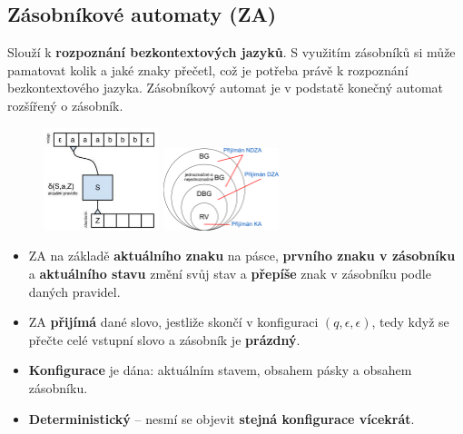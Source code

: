 \subsection{Zásobníkové automaty (ZA)}
Slouží k \textbf{rozpoznání bezkontextových jazyků}. S využitím zásobníků si může pamatovat kolik a jaké znaky přečetl, což je potřeba právě k rozpoznání bezkontextového jazyka. Zásobníkový automat je v podstatě konečný automat rozšířený o zásobník. 

\begin{figure}[H]
	\centering
	\includegraphics[width=0.30\textwidth]{assets/za}
	\includegraphics[width=0.30\textwidth]{assets/cfl}
\end{figure}

\begin{itemize}
\item ZA na základě \textbf{aktuálního znaku} na pásce, \textbf{prvního znaku v zásobníku} a \textbf{aktuálního stavu} změní svůj stav a \textbf{přepíše} znak v zásobníku podle daných pravidel.
\item ZA \textbf{přijímá} dané slovo, jestliže skončí v konfiguraci $(q, \epsilon, \epsilon)$, tedy když se přečte celé vstupní slovo a zásobník je \textbf{prázdný}.
\item \textbf{Konfigurace} je dána: aktuálním stavem, obsahem pásky a obsahem zásobníku.
\item \textbf{Deterministický} -- nesmí se objevit \textbf{stejná konfigurace vícekrát}.
\end{itemize}

